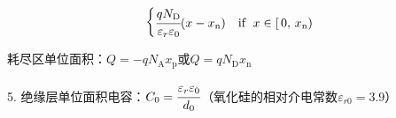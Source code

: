 \documentclass{ctexart}
\begin{document}
{\[\begin{cases}
            \cfrac{q N_\text{D}}{\varepsilon_r \varepsilon_0} (x - x_\text{n}) & \text{if }\; x \in [\, 0,\, x_\text{n})
        \end{cases}
    \]
    \vspace{-0.5cm} 
    \par
    \qquad 耗尽区单位面积：$ Q = -q N_\text{A} x_\text{p} $或$ Q = q N_\text{D} x_\text{n} $\par
    
    \vspace{0.5cm}

    5. 绝缘层单位面积电容：$C_0 = \cfrac{\varepsilon_r \varepsilon_0}{d_0}$（氧化硅的相对介电常数$\varepsilon_{r0} = 3.9$）
    
}
\end{document}

